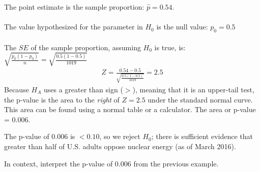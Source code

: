 \begin{examplewrap}
\begin{nexample}
\begin{description}
The point estimate is the sample proportion: $\hat{p} = 0.54.$\\
\\
The value hypothesized for the parameter in $H_0$ is the null value: $p_0 = 0.5$\\
\\
The $SE$ of the sample proportion, assuming $H_0$ is true, is: $\sqrt{\frac{p_0(1-p_0)}{n}}= \sqrt{\frac{0.5(1-0.5)}{1019}}$ \\
\begin{align*}
Z = \frac{0.54 - 0.5}{\sqrt{\frac{0.5(1-0.5)}{1019}}} = 2.5
\end{align*}
Because $H_A$ uses a greater than sign ($>$), meaning that it is an upper-tail test, the \mbox{p-value} is the area to the \emph{right} of $Z=2.5$ under the standard normal curve.  This area can be found using a normal table or a calculator.  The area or p-value = $0.006$.  
\item[\inferencestep{Conclude}]  The p-value of 0.006 is $< 0.10$, so we reject $H_0$; there is sufficient evidence that greater than half of U.S. adults oppose nuclear energy (as of March 2016).  
\end{description}
\end{nexample}
\end{examplewrap}



\begin{exercisewrap}
\begin{nexercise}
In context, interpret the p-value of 0.006 from the previous example.\footnotemark
\end{nexercise}
\end{exercisewrap}


\D{\newpage}

